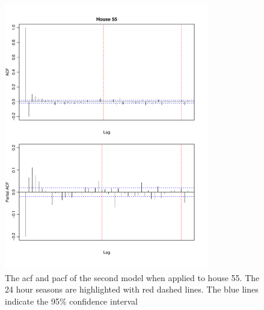  \begin{figure}
    \centering
    \includegraphics[width=0.8\textwidth]{../../../figures/arimax/ACF_55_short.pdf}
    \caption{The acf and pacf of the second model when applied to house 55. The 24 hour seasons are highlighted with red dashed lines. The blue lines indicate the 95\% confidence interval}
    \label{fig:Model2_acf_55}
\end{figure}


